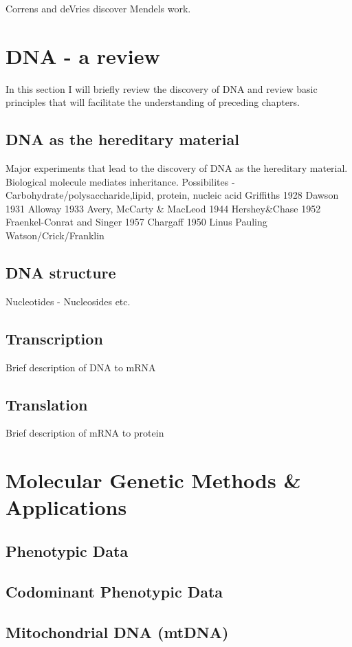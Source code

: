 \documentclass[11pt, oneside]{article}
\begin{document}
 Correns and deVries discover Mendels work. 

\section{DNA - a review}
In this section I will briefly review the discovery of DNA and review basic principles that will facilitate the 
understanding of preceding chapters. 
\subsection{DNA as the hereditary material}
Major experiments that lead to the discovery of DNA as the hereditary material. 
Biological molecule mediates inheritance. Possibilites - Carbohydrate/polysaccharide,lipid, protein, nucleic acid
Griffiths 1928
Dawson 1931
Alloway 1933
Avery, McCarty \& MacLeod 1944
Hershey\&Chase 1952
Fraenkel-Conrat and Singer 1957
Chargaff 1950
Linus Pauling
Watson/Crick/Franklin
\subsection{DNA structure}
Nucleotides - Nucleosides etc. 
\subsection{Transcription}
Brief description of DNA to mRNA
\subsection{Translation}
Brief description of mRNA to protein

\section{Molecular Genetic Methods \& Applications}

\subsection{Phenotypic Data}

\subsection{Codominant Phenotypic Data}

\subsection{Mitochondrial DNA (mtDNA)}
\end{document}
